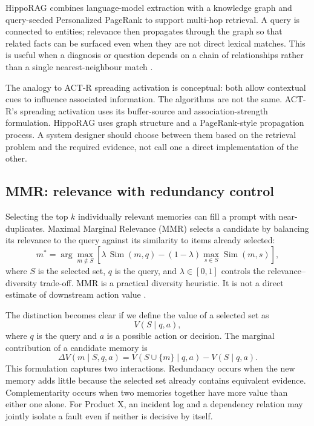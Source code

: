 HippoRAG combines language-model extraction with a knowledge graph and query-seeded Personalized PageRank to support multi-hop retrieval. A query is connected to entities; relevance then propagates through the graph so that related facts can be surfaced even when they are not direct lexical matches. This is useful when a diagnosis or question depends on a chain of relationships rather than a single nearest-neighbour match \autocite{gutierrez2024hipporag}.

The analogy to ACT-R spreading activation is conceptual: both allow contextual cues to influence associated information. The algorithms are not the same. ACT-R's spreading activation uses its buffer-source and association-strength formulation. HippoRAG uses graph structure and a PageRank-style propagation process. A system designer should choose between them based on the retrieval problem and the required evidence, not call one a direct implementation of the other.

\subsection{MMR: relevance with redundancy control}
\label{subsec:ch12-mmr}

Selecting the top \(k\) individually relevant memories can fill a prompt with near-duplicates. Maximal Marginal Relevance (MMR) selects a candidate by balancing its relevance to the query against its similarity to items already selected:
\begin{equation}
  m^* = \arg\max_{m\notin S}
  \left[\lambda\,\operatorname{Sim}(m,q)
  -(1-\lambda)\max_{s\in S}\operatorname{Sim}(m,s)\right],
  \label{eq:ch12-mmr}
\end{equation}
where \(S\) is the selected set, \(q\) is the query, and \(\lambda\in[0,1]\) controls the relevance--diversity trade-off. MMR is a practical diversity heuristic. It is not a direct estimate of downstream action value \autocite{carbonell1998mmr}.

The distinction becomes clear if we define the value of a selected set as
\begin{equation}
  V(S\mid q,a),
  \label{eq:ch12-set-value}
\end{equation}
where \(q\) is the query and \(a\) is a possible action or decision. The marginal contribution of a candidate memory is
\begin{equation}
  \Delta V(m\mid S,q,a)=V(S\cup\{m\}\mid q,a)-V(S\mid q,a).
  \label{eq:ch12-marginal-value}
\end{equation}
This formulation captures two interactions. Redundancy occurs when the new memory adds little because the selected set already contains equivalent evidence. Complementarity occurs when two memories together have more value than either one alone. For Product X, an incident log and a dependency relation may jointly isolate a fault even if neither is decisive by itself.

